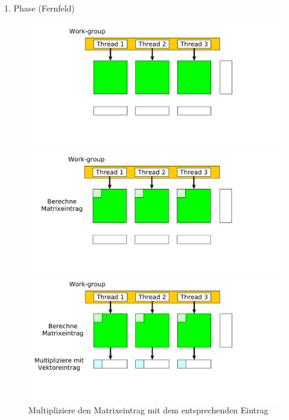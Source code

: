 \documentclass[10pt]{beamer}
\begin{document}
\begin{frame}{1. Phase (Fernfeld)}
  \begin{figure}
    \begin{overprint}
        \centering
        \includegraphics[width=\linewidth]{figures/fg-ff-initial-situation.pdf}
        \caption{Ausgangssituation einer OpenCL-Work-Group in der 1. Phase.}
        \centering
        \includegraphics[width=\linewidth]{figures/fg-ff-compute-matrix-entry.pdf}
        \caption{Berechne den ersten Eintrag einer Matrixzeile.}
        \centering
        \includegraphics[width=\linewidth]{figures/fg-ff-multiply-vector.pdf}
        \caption{Multipliziere den Matrixeintrag mit dem entsprechenden Eintrag
}
\end{overprint}
\end{figure}
\end{frame}
\end{document}
